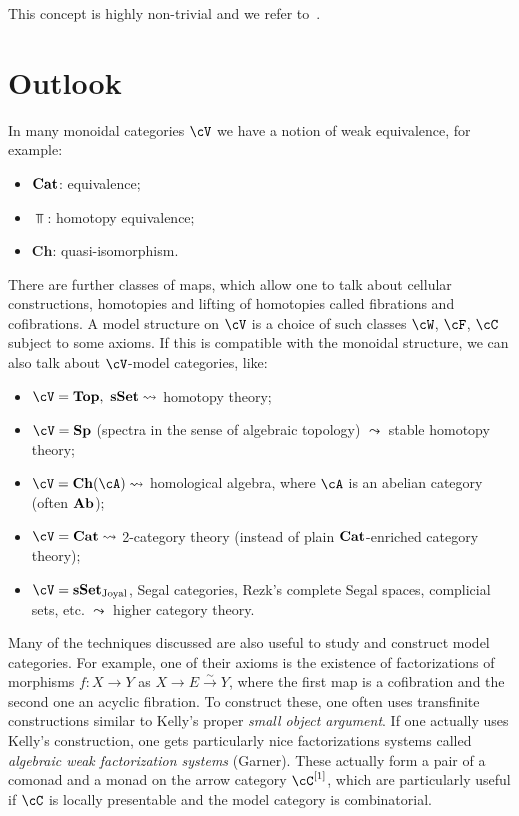 \documentclass[a4paper,11pt,oneside,openany]{scrbook}
\begin{document}
This concept is highly non-trivial and we refer to~\cite{riehl2016homotopy}.

\section{Outlook}

In many monoidal categories $\cV$ we have a notion of weak equivalence, for
example:
\begin{itemize}
	\item ${\normalfont\textbf{Cat}}$: equivalence;
	\item $\Top$: homotopy equivalence;
	\item $\mathbf{Ch}$: quasi-isomorphism.
\end{itemize}

There are further classes of maps, which allow one to talk about cellular
constructions, homotopies and lifting of homotopies called fibrations and
cofibrations. A model structure on $\cV$ is a choice of such classes $\cW$,
$\cF$, $\cC$ subject to some axioms. If this is compatible with the monoidal
structure, we can also talk about $\cV$-model categories, like:
\begin{itemize}
	\item $\cV=\Top,\ \sSet\leadsto$ homotopy theory;
	\item $\cV=\mathbf{Sp}$ (spectra in the sense of algebraic
	      topology) $\leadsto$ stable homotopy theory;
	\item $\cV=\mathbf{Ch}(\cA)\leadsto$ homological algebra, where $\cA$
	      is an abelian category (often ${\normalfont\textbf{Ab}}$);
	\item $\cV=\Cat\leadsto$ 2-category theory (instead of plain
	      ${\normalfont\textbf{Cat}}$-enriched category theory);
	\item $\cV=\sSet_{\text{Joyal}}$, Segal categories, Rezk’s complete Segal spaces, complicial
	      sets, etc. $\leadsto$ higher category theory.
\end{itemize}

Many of the techniques discussed are also useful to study and construct model
categories. For example, one of their axioms is the existence of factorizations
of morphisms $f\colon X\rightarrow Y$ as $X\rightarrow E\xrightarrow{\sim}Y$,
where the first map is a cofibration and the second one an acyclic fibration. To
construct these, one often uses transfinite constructions similar to Kelly's
proper \emph{small object argument}. If one actually uses Kelly's construction,
one gets particularly nice factorizations systems called \emph{algebraic weak
	factorization systems} (Garner). These actually form a pair of a comonad and a
monad on the arrow category $\cC^{[1]}$, which are particularly useful if $\cC$
is locally presentable and the model category is combinatorial.
\end{document}

